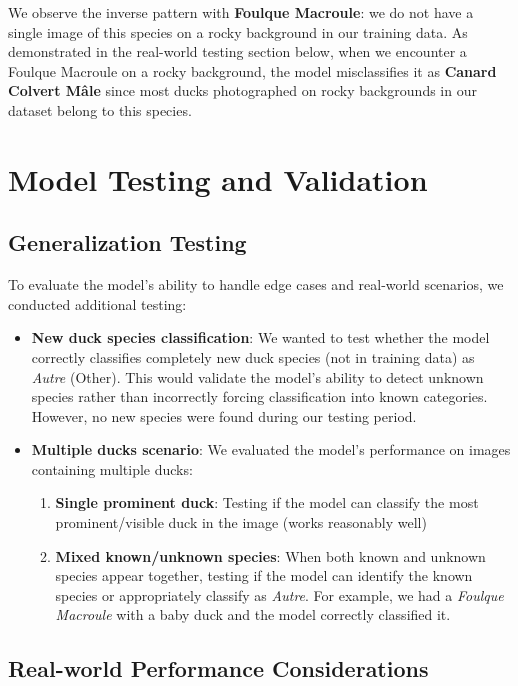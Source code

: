 \documentclass[12pt,a4paper]{article}
\begin{document}
We observe the inverse pattern with \textbf{Foulque Macroule}: we do not have a single image of this species on a rocky background in our training data. As demonstrated in the real-world testing section below, when we encounter a Foulque Macroule on a rocky background, the model misclassifies it as \textbf{Canard Colvert Mâle} since most ducks photographed on rocky backgrounds in our dataset belong to this species.

\section{Model Testing and Validation}

\subsection{Generalization Testing}

To evaluate the model's ability to handle edge cases and real-world scenarios, we conducted additional testing:

\begin{itemize}
    \item \textbf{New duck species classification}: We wanted to test whether the model correctly classifies completely new duck species (not in training data) as \textit{Autre} (Other). This would validate the model's ability to detect unknown species rather than incorrectly forcing classification into known categories. However, no new species were found during our testing period.

    \item \textbf{Multiple ducks scenario}: We evaluated the model's performance on images containing multiple ducks:
    \begin{enumerate}
        \item \textbf{Single prominent duck}: Testing if the model can classify the most prominent/visible duck in the image (works reasonably well)
        \item \textbf{Mixed known/unknown species}: When both known and unknown species appear together, testing if the model can identify the known species or appropriately classify as \textit{Autre}. For example, we had a \textit{Foulque Macroule} with a baby duck and the model correctly classified it.
    \end{enumerate}
\end{itemize}

\subsection{Real-world Performance Considerations}
\end{document}

